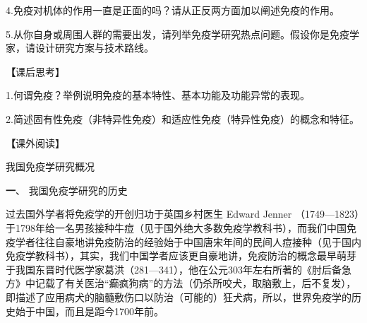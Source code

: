 4.免疫对机体的作用一直是正面的吗？请从正反两方面加以阐述免疫的作用。

5.从你自身或周围人群的需要出发，请列举免疫学研究热点问题。假设你是免疫学家，请设计研究方案与技术路线。

{\textbf 【课后思考】}

1.何谓免疫？举例说明免疫的基本特性、基本功能及功能异常的表现。

2.简述固有性免疫（非特异性免疫）和适应性免疫（特异性免疫）的概念和特征。

{\textbf 【课外阅读】}
\begin{center}
{\Large 我国免疫学研究概况}
\end{center}
\begin{center}
{\large\textbf 一、 我国免疫学研究的历史}
\end{center}

过去国外学者将免疫学的开创归功于英国乡村医生 Edward Jenner
（1749---1823）于1798年给一名男孩接种牛痘（见于国外绝大多数免疫学教科书），而我们中国免疫学者往往自豪地讲免疫防治的经验始于中国唐宋年间的民间人痘接种（见于国内免疫学教科书），其实，我们中国学者应该更自豪地讲，免疫防治的概念最早萌芽于我国东晋时代医学家葛洪（281---341），他在公元303年左右所著的《肘后备急方》中记载了有关医治“癫疯狗病”的方法（仍杀所咬犬，取脑敷上，后不复发），即描述了应用病犬的脑髓敷伤口以防治（可能的）狂犬病，所以，世界免疫学的历史始于中国，而且是距今1700年前。

